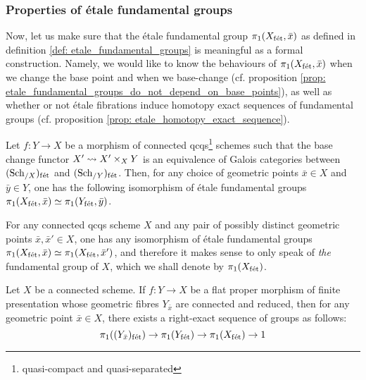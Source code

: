             \subsubsection{Properties of \'etale fundamental groups}
                Now, let us make sure that the \'etale fundamental group $\pi_1(X_{\mathrm{f\acute{e}t}}, \bar{x})$ as defined in definition \ref{def: etale_fundamental_groups} is meaningful as a formal construction. Namely, we would like to know the behaviours of $\pi_1(X_{\mathrm{f\acute{e}t}}, \bar{x})$ when we change the base point and when we base-change (cf. proposition \ref{prop: etale_fundamental_groups_do_not_depend_on_base_points}), as well as whether or not \'etale fibrations induce homotopy exact sequences of fundamental groups (cf. proposition \ref{prop: etale_homotopy_exact_sequence}). 
                \begin{proposition} \label{prop: etale_fundamental_groups_do_not_depend_on_base_points}
                    \cite[\href{https://stacks.math.columbia.edu/tag/0BQA}{Tag 0BQA}]{stacks} Let $f: Y \to X$ be a morphism of connected qcqs\footnote{quasi-compact and quasi-separated} schemes such that the base change functor $X' \mapsto X' \x_X Y$ is an equivalence of Galois categories between $(\mathrm{Sch}_{/X})_{\mathrm{f\acute{e}t}}$ and $(\mathrm{Sch}_{/Y})_{\mathrm{f\acute{e}t}}$. Then, for any choice of geometric points $\bar{x} \in X$ and $\bar{y} \in Y$, one has the following isomorphism of \'etale fundamental groups $\pi_1(X_{\mathrm{f\acute{e}t}}, \bar{x}) \simeq \pi_1(Y_{\mathrm{f\acute{e}t}}, \bar{y})$.
                \end{proposition}
                \begin{corollary} \label{coro: etale_fundamental_group_uniqueness}
                    For any connected qcqs scheme $X$ and any pair of possibly distinct geometric points $\bar{x}, \bar{x}' \in X$, one has any isomorphism of \'etale fundamental groups $\pi_1(X_{\mathrm{f\acute{e}t}}, \bar{x}) \simeq \pi_1(X_{\mathrm{f\acute{e}t}}, \bar{x}')$, and therefore it makes sense to only speak of \textit{the} fundamental group of $X$, which we shall denote by $\pi_1(X_{\mathrm{f\acute{e}t}})$.
                \end{corollary}
                
                \begin{proposition} \label{prop: etale_homotopy_exact_sequence}
                    \cite[\href{https://stacks.math.columbia.edu/tag/0C0J}{Tag 0C0J}]{stacks} Let $X$ be a connected scheme. If $f: Y \to X$ be a flat proper morphism of finite presentation whose geometric fibres $Y_{\bar{x}}$ are connected and reduced, then for any geometric point $\bar{x} \in X$, there exists a right-exact sequence of groups as follows:
                        $$\pi_1((Y_{\bar{x}})_{\mathrm{f\acute{e}t}}) \to \pi_1(Y_{\mathrm{f\acute{e}t}}) \to \pi_1(X_{\mathrm{f\acute{e}t}}) \to 1$$
                \end{proposition}
        
